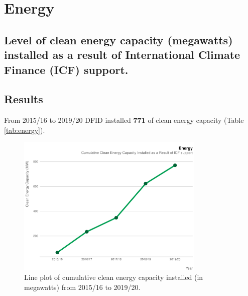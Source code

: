 \chapter{Energy}

\section*{Level of clean energy capacity (megawatts) installed as a result of International Climate Finance (ICF) support.}

\thispagestyle{empty}



\section{Results}

From 2015/16 to 2019/20 DFID installed \textbf{
771
} of clean energy capacity (Table \ref{tab:energy}). %

\begin{figure}[htbp]
	\centering
\begin{knitrout}
\color{fgcolor}
\includegraphics[width=0.8\textwidth]{figs/energy_cumulative_plot-1} 

\end{knitrout}
	\caption{Line plot of cumulative clean energy capacity installed (in megawatts) from 2015/16 to 2019/20.}
	\label{fig:energy_cumulative_plot}
\end{figure}

